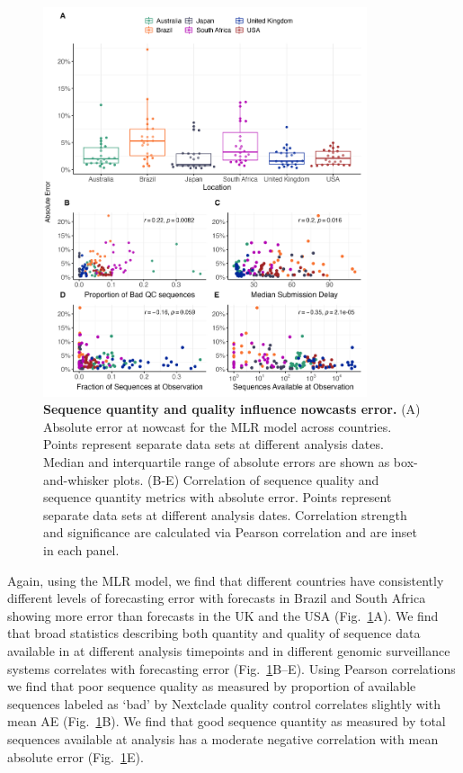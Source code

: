 \documentclass[11pt,oneside,letterpaper]{article}
\begin{document}
\begin{figure}[tb!]
	\centering
    \includegraphics[width=0.85\textwidth]{figures/Var_of_interest.png}
	\caption{
		\textbf{Sequence quantity and quality influence nowcasts error.}
    (A) Absolute error at nowcast for the MLR model across countries.
		Points represent separate data sets at different analysis dates.
		Median and interquartile range of absolute errors are shown as box-and-whisker plots.
		(B-E) Correlation of sequence quality and sequence quantity metrics with absolute error.
		Points represent separate data sets at different analysis dates.
    Correlation strength and significance are calculated via Pearson correlation and are inset in each panel.
	}
	\label{fig:vars_of_interest}
\end{figure}

Again, using the MLR model, we find that different countries have consistently different levels of forecasting error with forecasts in Brazil and South Africa showing more error than forecasts in the UK and the USA  (Fig.~\ref{fig:vars_of_interest}A).
We find that broad statistics describing both quantity and quality of sequence data available in at different analysis timepoints and in different genomic surveillance systems correlates with forecasting error (Fig.~\ref{fig:vars_of_interest}B--E).
Using Pearson correlations we find that poor sequence quality as measured by proportion of available sequences labeled as `bad' by Nextclade quality control \cite{aksamentov2021nextclade} correlates slightly with mean AE (Fig.~\ref{fig:vars_of_interest}B).
We find that good sequence quantity as measured by total sequences available at analysis has a moderate negative correlation with mean absolute error (Fig.~\ref{fig:vars_of_interest}E).
\end{document}
